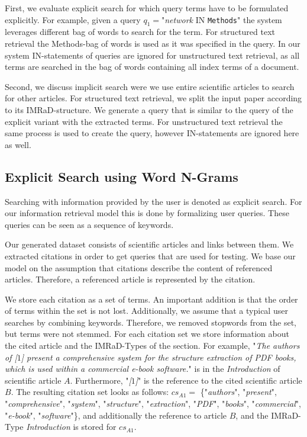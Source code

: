 First, we evaluate explicit search for which query terms have to be formulated explicitly. For example, given a query $q_1=$"\textit{network} IN \texttt{Methods}" the system leverages different bag of words to search for the term. For structured text retrieval the Methods-bag of words is used as it was specified in the query. In our system IN-statements of queries are ignored for unstructured text retrieval, as all terms are searched in the bag of words containing all index terms of a document.

Second, we discuss implicit search were we use entire scientific articles to search for other articles. For structured text retrieval, we split the input paper according to its IMRaD-structure. We generate a query that is similar to the query of the explicit variant with the extracted terms. For unstructured text retrieval the same process is used to create the query, however IN-statements are ignored here as well.


\subsection{Explicit Search using Word N-Grams}
\label{sec:explicit_search_ngrams}

Searching with information provided by the user is denoted as explicit search. For our information retrieval model this is done by formalizing user queries. These queries can be seen as a sequence of keywords.

Our generated dataset consists of scientific articles and links between them. We extracted citations in order to get queries that are used for testing. We base our model on the assumption that citations describe the content of referenced articles. Therefore, a referenced article is represented by the citation.

We store each citation as a set of terms. An important addition is that the order of terms within the set is not lost. Additionally, we assume that a typical user searches by combining keywords. Therefore, we removed stopwords from the set, but terms were not stemmed. For each citation set we store information about the cited article and the IMRaD-Types of the section. For example, "\textit{The authors of [$1$] present a comprehensive system for the structure extraction of PDF books, which is used within a commercial e-book software.}" is in the \textit{Introduction} of scientific article $A$. Furthermore, "\textit{[$1$]}" is the reference to the cited scientific article $B$. The resulting citation set looks as follows: $cs_{A1} =$ \{"\textit{authors}", "\textit{present}", "\textit{comprehensive}", "\textit{system}", "\textit{structure}", "\textit{extraction}", "\textit{PDF}", "\textit{books}", "\textit{commercial}", "\textit{e-book}", "\textit{software}"\}, and additionally the reference to article $B$, and the IMRaD-Type \textit{Introduction} is stored for $cs_{A1}$.

